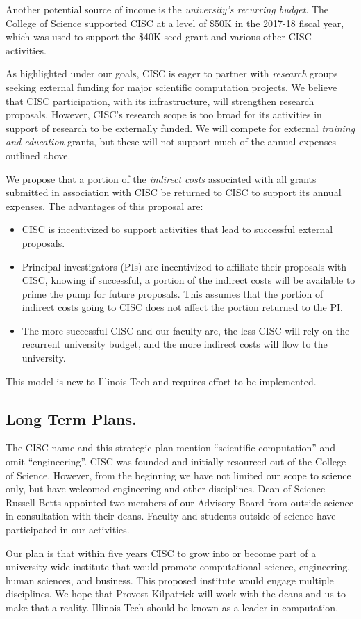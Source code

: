 \documentclass[12pt]{amsart}
\begin{document}
Another potential source of income is the \emph{university's recurring budget}.  The College of Science supported CISC at a level of \$50K in the 2017-18 fiscal year, which was used to support the \$40K seed grant and various other CISC activities.

As highlighted under our goals, CISC is eager to partner with \emph{research} groups seeking external funding for major scientific computation projects.  We believe that CISC participation, with its infrastructure, will strengthen research proposals.  However, CISC's research scope is too broad for its activities in support of research to be externally funded.  We will compete for external \emph{training and education} grants, but these will not support much of the annual expenses outlined above.

We propose that a portion of the \emph{indirect costs} associated with all grants submitted in association with CISC be returned to CISC to support its annual expenses.  The advantages of this proposal are:
\begin{itemize}
    \item CISC is incentivized to support activities that lead to successful external proposals.
    
    \item Principal investigators (PIs) are incentivized to affiliate their proposals with CISC, knowing if successful, a portion of the indirect costs will be available to prime the pump for future proposals.  This assumes that the portion of indirect costs going to CISC does not affect the portion returned to the PI.
    
    \item The more successful CISC and our faculty are, the less CISC will rely on the recurrent university budget, and the more indirect costs will flow to the university.
\end{itemize}
This model is new to Illinois Tech and requires effort to be implemented.


\subsection*{Long Term Plans.}
The CISC name and this strategic plan mention ``scientific computation'' and omit ``engineering''.  CISC was founded and initially resourced out of the College of Science.  However, from the beginning we have not limited our scope to science only, but have welcomed engineering and other disciplines.  Dean of Science Russell Betts appointed two members of our Advisory Board from outside science in consultation with their deans.  Faculty and students outside of science have participated in our activities.

Our plan is that within five years CISC to grow into or become part of a university-wide institute that would promote computational science, engineering, human sciences, and business.  This proposed institute would engage multiple disciplines.  We hope that Provost Kilpatrick will work with the deans and us to make that a reality.  Illinois Tech should be known as a leader in computation.
\end{document}
